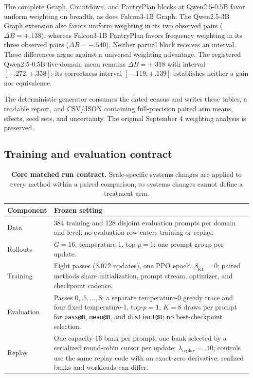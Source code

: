 \documentclass{article}
\newcommand{\1}{\mathbf 1}
\theoremstyle{remark}
\theoremstyle{definition}
\theoremstyle{plain}
\begin{document}
The complete Graph, Countdown, and PantryPlan blocks at Qwen2.5-0.5B
favor uniform weighting on breadth, as does Falcon3-1B Graph. The
Qwen2.5-3B Graph extension also favors uniform weighting in its two observed
pairs ($\Delta B=+.138$), whereas Falcon3-1B PantryPlan favors frequency
weighting in its three observed pairs ($\Delta B=-.540$). Neither partial
block receives an interval. These differences argue against a universal
weighting advantage. The registered Qwen2.5-0.5B five-domain mean remains
$\Delta B=+.318$ with interval $[+.272,+.358]$; its correctness interval
$[-.119,+.139]$ establishes neither a gain nor equivalence.

The deterministic generator
 consumes the
dated census and writes these tables, a readable report, and CSV/JSON
containing full-precision paired arm means, effects, seed sets, and
uncertainty. The original September 4 weighting analysis is preserved.


\subsection{Training and evaluation contract}
\label{app:repro-run-contract}

\begin{table}[H]
  \centering
  \caption{\textbf{Core matched run contract.} Scale-specific systems changes
  are applied to every method within a paired comparison, so systems changes
  cannot define a treatment arm.}
  \label{tab:run-contract}
  \small
  \begin{tabularx}{\linewidth}{@{}P{.24\linewidth}Y@{}}
    \toprule
    \textbf{Component} & \textbf{Frozen setting} \\
    \midrule
    Data & 384 training and 128 disjoint evaluation prompts per domain and
      level; no evaluation row enters training or replay. \\
    Rollouts & $G=16$, temperature 1, top-$p=1$; one prompt group per update. \\
    Training & Eight passes (3,072 updates), one PPO epoch,
      $\beta_{\mathrm{KL}}=0$; paired methods share initialization, prompt stream,
      optimizer, and checkpoint cadence. \\
    Evaluation & Passes $0,.5,\ldots,8$; a separate temperature-0 greedy
      trace and four fixed temperature-1, top-$p=1$, $K=8$ draws per prompt for
      \texttt{pass@8}, \texttt{mean@8}, and \texttt{distinct@8}; no
      best-checkpoint selection. \\
    Replay & One capacity-16 bank per prompt; one bank selected by a serialized
      round-robin cursor per update; $\lambda_{\mathrm{replay}}=.10$; controls
      use the same replay code with an exact-zero derivative; realized banks and workloads can differ. \\
    \bottomrule
  \end{tabularx}
\end{table}
\end{document}
